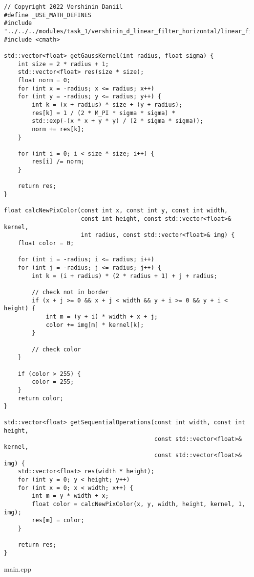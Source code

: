 \documentclass{report}
\begin{document}
\begin{lstlisting}
// Copyright 2022 Vershinin Daniil
#define _USE_MATH_DEFINES
#include "../../../modules/task_1/vershinin_d_linear_filter_horizontal/linear_filter_horizontal.h"
#include <cmath>

std::vector<float> getGaussKernel(int radius, float sigma) {
	int size = 2 * radius + 1;
	std::vector<float> res(size * size);
	float norm = 0;
	for (int x = -radius; x <= radius; x++)
	for (int y = -radius; y <= radius; y++) {
		int k = (x + radius) * size + (y + radius);
		res[k] = 1 / (2 * M_PI * sigma * sigma) *
		std::exp(-(x * x + y * y) / (2 * sigma * sigma));
		norm += res[k];
	}
	
	for (int i = 0; i < size * size; i++) {
		res[i] /= norm;
	}
	
	return res;
}

float calcNewPixColor(const int x, const int y, const int width,
                      const int height, const std::vector<float>& kernel,
                      int radius, const std::vector<float>& img) {
	float color = 0;
	
	for (int i = -radius; i <= radius; i++)
	for (int j = -radius; j <= radius; j++) {
		int k = (i + radius) * (2 * radius + 1) + j + radius;
		
		// check not in border
		if (x + j >= 0 && x + j < width && y + i >= 0 && y + i < height) {
			int m = (y + i) * width + x + j;
			color += img[m] * kernel[k];
		}
		
		// check color
	}
	
	if (color > 255) {
		color = 255;
	}
	return color;
}

std::vector<float> getSequentialOperations(const int width, const int height,
                                           const std::vector<float>& kernel,
                                           const std::vector<float>& img) {
	std::vector<float> res(width * height);
	for (int y = 0; y < height; y++)
	for (int x = 0; x < width; x++) {
		int m = y * width + x;
		float color = calcNewPixColor(x, y, width, height, kernel, 1, img);
		res[m] = color;
	}
	
	return res;
}
\end{lstlisting}
main.cpp
\end{document}
